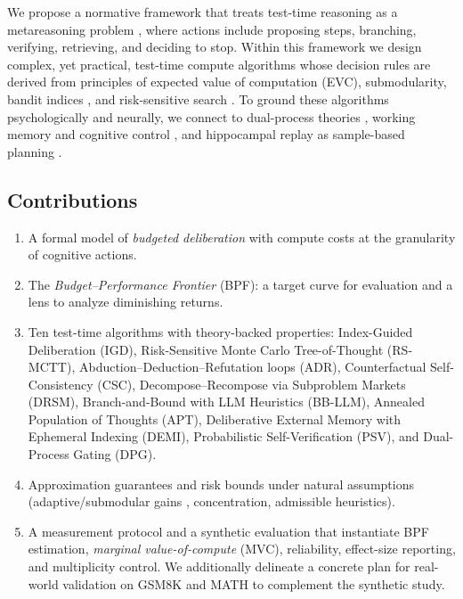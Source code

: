 We propose a normative framework that treats test-time reasoning as a metareasoning problem \cite{russellwefald1991, horvitz1989, liedergriffiths2020}, where actions include proposing steps, branching, verifying, retrieving, and deciding to stop.
Within this framework we design complex, yet practical, test-time compute algorithms whose decision rules are derived from principles of expected value of computation (EVC), submodularity, bandit indices \cite{gittins1979,whittle1988restless}, and risk-sensitive search \cite{howard1972risk,tamar2015pgcrm}.
To ground these algorithms psychologically and neurally, we connect to dual-process theories \cite{kahneman2011}, working memory and cognitive control \cite{baddeley1992workingmemory,gershmandaw2017,dehaene2011gnw}, and hippocampal replay as sample-based planning \cite{pfeifferfoster2013}.

\subsection{Contributions}
\begin{enumerate}[leftmargin=1.6em, itemsep=0.25em, topsep=0.25em]
    \item A formal model of \emph{budgeted deliberation} with compute costs at the granularity of cognitive actions.
    \item The \emph{Budget--Performance Frontier} (BPF): a target curve for evaluation and a lens to analyze diminishing returns.
    \item Ten test-time algorithms with theory-backed properties: 
    Index-Guided Deliberation (IGD), Risk-Sensitive Monte Carlo Tree-of-Thought (RS-MCTT), 
    Abduction--Deduction--Refutation loops (ADR), Counterfactual Self-Consistency (CSC), 
    Decompose--Recompose via Subproblem Markets (DRSM), Branch-and-Bound with LLM Heuristics (BB-LLM),
    Annealed Population of Thoughts (APT), Deliberative External Memory with Ephemeral Indexing (DEMI),
    Probabilistic Self-Verification (PSV), and Dual-Process Gating (DPG).
    \item Approximation guarantees and risk bounds under natural assumptions (adaptive/submodular gains \cite{nemhauser1978,golovin2011adaptive}, concentration, admissible heuristics).
    \item A measurement protocol and a synthetic evaluation that instantiate BPF estimation, \emph{marginal value-of-compute} (MVC), reliability, effect-size reporting, and multiplicity control. We additionally delineate a concrete plan for real-world validation on GSM8K and MATH to complement the synthetic study.
\end{enumerate}

